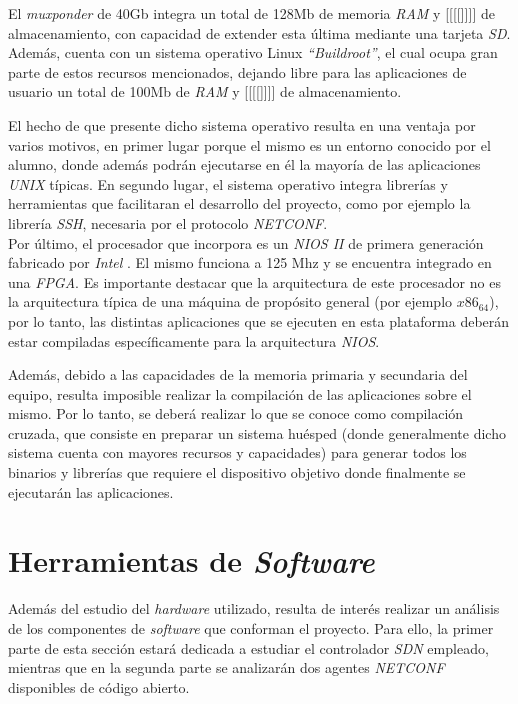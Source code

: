 El \textit{muxponder} de 40Gb integra un total de 128Mb de memoria \textit{RAM} y [[[[]]]] de almacenamiento, con capacidad de extender esta última mediante una tarjeta \textit{SD}. Además, cuenta con un sistema operativo Linux \textit{“Buildroot”}, el cual ocupa gran parte de estos recursos mencionados, dejando libre para las aplicaciones de usuario un total de 100Mb de \textit{RAM} y [[[[]]]] de almacenamiento.

El hecho de que presente dicho sistema operativo resulta en una ventaja por varios motivos, en primer lugar porque el mismo es un entorno conocido por el alumno, donde además podrán ejecutarse en él la mayoría de las aplicaciones \textit{UNIX} típicas. En segundo lugar, el sistema operativo integra librerías y herramientas que facilitaran el desarrollo del proyecto, como por ejemplo la librería \textit{SSH}, necesaria por el protocolo \textit{NETCONF}.
\\

Por último, el procesador que incorpora es un \textit{NIOS II} de primera generación fabricado por \textit{Intel} \parencite{intelaltera}. El mismo funciona a 125 Mhz y se encuentra integrado en una \textit{FPGA}. Es importante destacar que la arquitectura de este procesador no es la arquitectura típica de una máquina de propósito general (por ejemplo $x86_64$), por lo tanto, las distintas aplicaciones que se ejecuten en esta plataforma deberán estar compiladas específicamente para la arquitectura \textit{NIOS}. 

Además, debido a las capacidades de la memoria primaria y secundaria del equipo, resulta imposible realizar la compilación de las aplicaciones sobre el mismo. Por lo tanto, se deberá realizar lo que se conoce como compilación cruzada, que consiste en preparar un sistema huésped (donde generalmente dicho sistema cuenta con mayores recursos y capacidades) para generar todos los binarios y librerías que requiere el dispositivo objetivo donde finalmente se ejecutarán las aplicaciones.


\section{Herramientas de \textit{Software}}

Además del estudio del \textit{hardware} utilizado, resulta de interés realizar un análisis de los componentes de \textit{software} que conforman el proyecto. Para ello, la primer parte de esta sección estará dedicada a estudiar el controlador \textit{SDN} empleado, mientras que en la segunda parte se analizarán dos agentes \textit{NETCONF} disponibles de código abierto.

